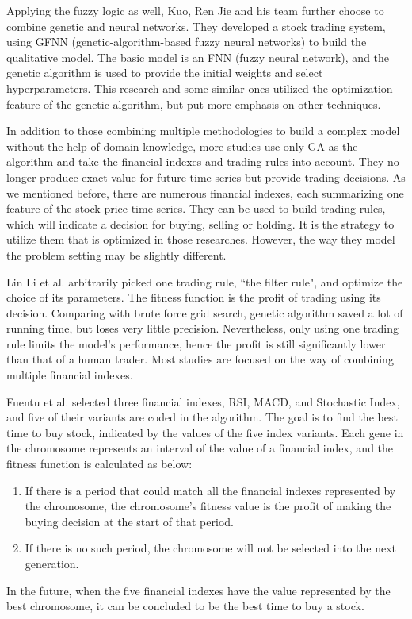 \documentclass{article}
\begin{document}
Applying the fuzzy logic as well, Kuo, Ren Jie and his team \cite{an-intelligent-stock-trading-decision-support-system}
further choose to combine genetic and neural networks.
They developed a stock trading system, using GFNN (genetic-algorithm-based fuzzy neural networks)
to build the qualitative model.
The basic model is an FNN (fuzzy neural network), and
the genetic algorithm is used to provide the initial weights and select hyperparameters.
This research and some similar ones utilized the optimization feature of the genetic algorithm,
but put more emphasis on other techniques.

In addition to those combining multiple methodologies to build a complex model
without the help of domain knowledge,
more studies use only GA as the algorithm and take the financial indexes and trading rules into account.
They no longer produce exact value for future time series but provide trading decisions.
As we mentioned before, there are numerous financial indexes,
each summarizing one feature of the stock price time series.
They can be used to build trading rules, which will indicate a decision for buying, selling or holding.
It is the strategy to utilize them that is optimized in those researches.
However, the way they model the problem setting may be slightly different.

Lin Li et al. \cite{the-applications-of-genetic-algorithms-in-stock-market-data-mining}
arbitrarily picked one trading rule, ``the filter rule", and optimize the choice of its parameters.
The fitness function is the profit of trading using its decision.
Comparing with brute force grid search, genetic algorithm saved a lot of running time,
but loses very little precision.
Nevertheless, only using one trading rule limits the model's performance, hence
the profit is still significantly lower than that of a human trader.
Most studies are focused on the way of combining multiple financial indexes.

Fuentu et al. \cite{genetic-algorithms-to-optimise-the-time-to-make-stock-market-investment} selected
three financial indexes, RSI, MACD, and Stochastic Index,
and five of their variants are coded in the algorithm.
The goal is to find the best time to buy stock, indicated by the values of the five index variants.
Each gene in the chromosome represents an interval of the value of a financial index,
and the fitness function is calculated as below:
\begin{enumerate}
\item If there is a period that could match all the financial indexes represented by the chromosome,
    the chromosome's fitness value is the profit of making the buying decision at the start of that period.
\item If there is no such period, the chromosome will not be selected into the next generation.
\end{enumerate}
In the future, when the five financial indexes have the value represented by the best chromosome,
it can be concluded to be the best time to buy a stock.
\end{document}

